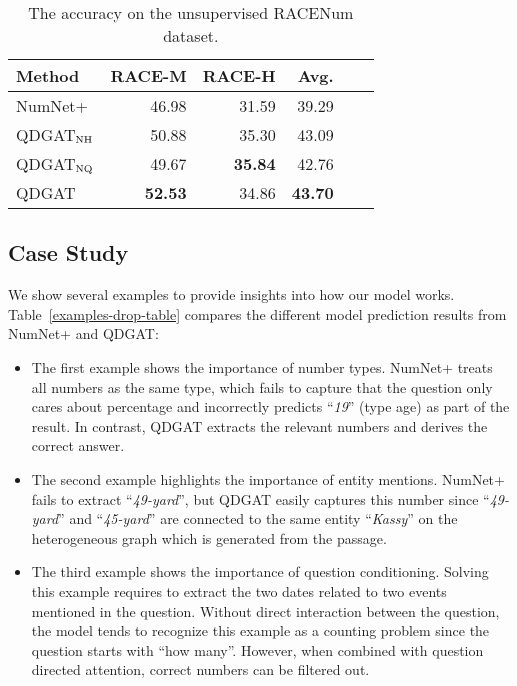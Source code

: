 \documentclass{article}
\begin{document}
\begin{table} 
\caption{The accuracy on the unsupervised RACENum dataset.}
\label{race-results-race-table}
\vskip 0.15in
\begin{center}
\begin{small}
\begin{tabularx}{\linewidth}{lRRRRr}
\toprule
Method & RACE-M & RACE-H  & Avg. \\
\midrule
NumNet+ & 46.98 & 31.59 & 39.29  \\
QDGAT$_{\rm NH}$  & 50.88 & 35.30 & 43.09 \\
QDGAT$_{\rm NQ}$ & 49.67 & \textbf{35.84} & 42.76 \\
QDGAT & \textbf{52.53} & 34.86 & \textbf{43.70} \\
\bottomrule
\end{tabularx}
\end{small}
\end{center}
\vskip -0.1in
\end{table}




\subsection{Case Study}
We show several examples to provide insights into how our model works. Table~\ref{examples-drop-table} compares the different model prediction results from NumNet+ and QDGAT:
\begin{itemize}\setlength\itemsep{0.5em}
\item The first example shows the importance of number types. NumNet+ treats all numbers as the same type, which fails to capture that the question only cares about percentage and incorrectly predicts ``\textit{19}'' (type age) as part of the result. In contrast, QDGAT extracts the relevant numbers and derives the correct answer.
\item The second example highlights the importance of entity mentions. NumNet+ fails to extract ``\textit{49-yard}'', but QDGAT easily captures this number since ``\textit{49-yard}'' and ``\textit{45-yard}'' are connected to the same entity ``\textit{Kassy}'' on the heterogeneous graph which is generated from the passage.
\item The third example shows the importance of question conditioning. 
Solving this example requires to extract the two dates related to two events mentioned in the question.
Without direct interaction between the question, the model tends to recognize this example as a counting problem since the question starts with ``how many''.
However, when combined with question directed attention, correct numbers can be filtered out.
\end{itemize}
\end{document}
